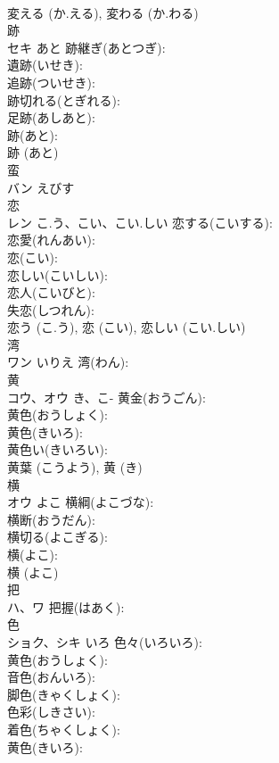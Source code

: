 \documentclass[8pt]{extreport}
\begin{document}
\begin{CJK}{UTF8}{min}
\\	変える (か.える), 変わる (か.わる)
\\	跡			
\\	セキ	あと	跡継ぎ(あとつぎ): 
\\	遺跡(いせき): 
\\	追跡(ついせき): 
\\	跡切れる(とぎれる): 
\\	足跡(あしあと): 
\\	跡(あと): 
\\	跡 (あと)
\\	蛮			
\\	バン	えびす		
\\	恋			
\\	レン	こ.う、こい、こい.しい	恋する(こいする): 
\\	恋愛(れんあい): 
\\	恋(こい): 
\\	恋しい(こいしい): 
\\	恋人(こいびと): 
\\	失恋(しつれん): 
\\	恋う (こ.う), 恋 (こい), 恋しい (こい.しい)
\\	湾			
\\	ワン	いりえ	湾(わん): 
\\	黄			
\\	コウ、オウ	き、こ-	黄金(おうごん): 
\\	黄色(おうしょく): 
\\	黄色(きいろ): 
\\	黄色い(きいろい): 
\\	黄葉 (こうよう), 黄 (き)
\\	横			
\\	オウ	よこ	横綱(よこづな): 
\\	横断(おうだん): 
\\	横切る(よこぎる): 
\\	横(よこ): 
\\	横 (よこ)
\\	把			
\\	ハ、ワ		把握(はあく): 
\\	色			
\\	ショク、シキ	いろ	色々(いろいろ): 
\\	黄色(おうしょく): 
\\	音色(おんいろ): 
\\	脚色(きゃくしょく): 
\\	色彩(しきさい): 
\\	着色(ちゃくしょく): 
\\	黄色(きいろ): 

\end{CJK}
\end{document}
